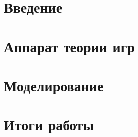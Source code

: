\documentclass{mipt-thesis-bs}
\begin{document}
\chapter{Введение}

\chapter{Аппарат теории игр}

\chapter{Моделирование}

\chapter{Итоги работы}


\printbib
\end{document}
